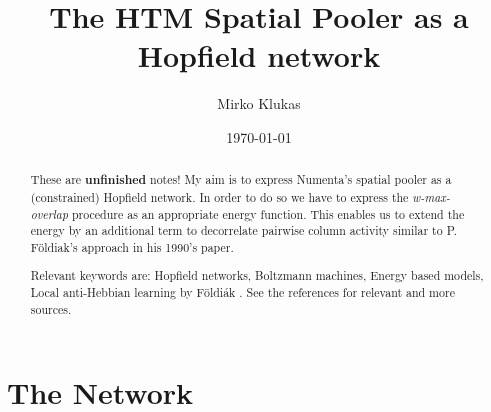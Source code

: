 \documentclass[titlepage]{amsart}
\theoremstyle{definition}
\begin{document}
\title[]{The HTM Spatial Pooler as a Hopfield network}


\author{Mirko Klukas}
\address[Mirko~Klukas]{Institute of Science and Technology Austria (IST Austria), 
Am Campus 1,
A – 3400 Klosterneuburg, Austria}
\date{\today}

%  
\begin{abstract}
These are \textbf{unfinished} notes!
My aim is to express Numenta's spatial pooler as a (constrained) Hopfield network.
In order to do so we have to express the \textit{w-max-overlap} procedure as
an appropriate energy function. This enables us to extend 
the energy by an additional term to decorrelate pairwise column activity
similar to P. Földiak's approach in his 1990's paper.

Relevant keywords are:
Hopfield networks, Boltzmann machines, Energy based models, Local anti-Hebbian learning by F\"oldi\'ak \cite{foldiak}.
See the references for relevant and more sources.
\end{abstract}
%
\maketitle
\tableofcontents
% 

% 
% 
\section{The Network}
% 
% 
% 
\end{document}
